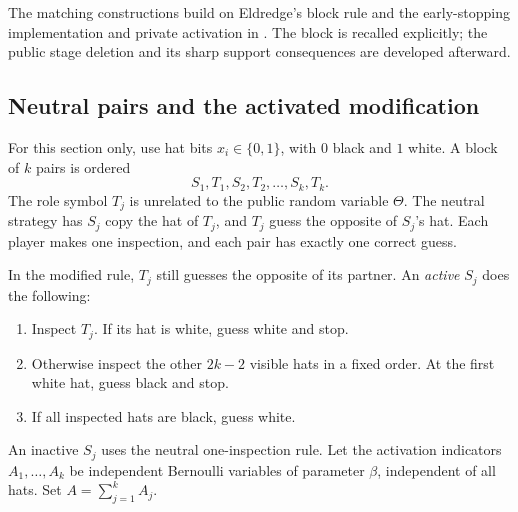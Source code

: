 \documentclass[11pt,letterpaper]{article}
\theoremstyle{definition}
\begin{document}
The matching constructions build on Eldredge's block rule
\cite[Proposition 6.6]{hat:Eldredge} and the early-stopping implementation
and private activation in \cite{rnd:ProveIt}. The block is recalled
explicitly; the public stage deletion and its sharp support consequences
are developed afterward.

\subsection{Neutral pairs and the activated modification}

For this section only, use hat bits $x_i\in\{0,1\}$, with $0$ black and
$1$ white. A block of $k$ pairs is ordered
\[
 S_1,T_1,S_2,T_2,\ldots,S_k,T_k.
\]
The role symbol $T_j$ is unrelated to the public random variable $\Theta$.
The neutral strategy has $S_j$ copy the hat of $T_j$, and $T_j$ guess
the opposite of $S_j$'s hat. Each player makes one inspection, and each
pair has exactly one correct guess.

In the modified rule, $T_j$ still guesses the opposite of its partner.
An \emph{active} $S_j$ does the following:
\begin{enumerate}
\item Inspect $T_j$. If its hat is white, guess white and stop.
\item Otherwise inspect the other $2k-2$ visible hats in a fixed order.
At the first white hat, guess black and stop.
\item If all inspected hats are black, guess white.
\end{enumerate}
An inactive $S_j$ uses the neutral one-inspection rule. Let the
activation indicators $A_1,\ldots,A_k$ be independent Bernoulli
variables of parameter $\beta$, independent of all hats. Set
$A=\sum_{j=1}^k A_j$.
\end{document}
